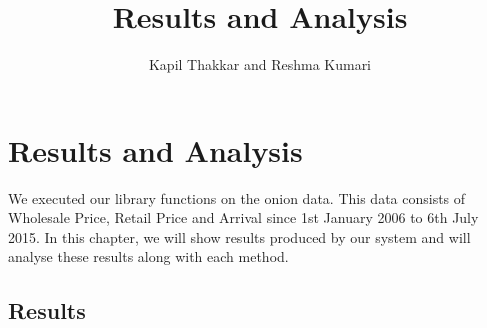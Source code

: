 \documentclass[a4paper,10pt]{report}
\title{Results and Analysis}
\author{Kapil Thakkar and Reshma Kumari}
\begin{document}
\maketitle

\chapter{Results and Analysis}

We executed our library functions on the onion data. This data consists of 
Wholesale Price, Retail Price and Arrival since 1st January 2006 to 6th July 
2015. In this chapter, we will show results produced by our system and will 
analyse these results along with each method.

\section{Results}
\end{document}
